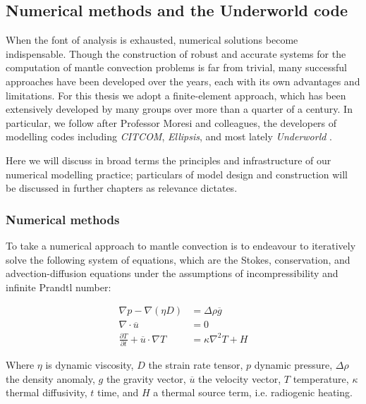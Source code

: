 \documentclass[a4paper,11pt,oneside]{book}
\begin{document}
\subsection{Numerical methods and the Underworld code}

When the font of analysis is exhausted, numerical solutions become indispensable. Though the construction of robust and accurate systems for the computation of mantle convection problems is far from trivial, many successful approaches have been developed over the years, each with its own advantages and limitations. For this thesis we adopt a finite-element approach, which has been extensively developed by many groups over more than a quarter of a century. In particular, we follow after Professor Moresi and colleagues, the developers of modelling codes including \textit{CITCOM}, \textit{Ellipsis}, and most lately \textit{Underworld} \citet{Moresi1995-rn, Moresi1996-fn, Zhong1998-qg, Moresi2002-pj, Moresi2003-ip, Farrington2005-mo, Moresi2007-dg, May2008-pq, Beucher2019-aq}.

Here we will discuss in broad terms the principles and infrastructure of our numerical modelling practice; particulars of model design and construction will be discussed in further chapters as relevance dictates.

\subsubsection{Numerical methods}

To take a numerical approach to mantle convection is to endeavour to iteratively solve the following system of equations, which are the Stokes, conservation, and advection-diffusion equations under the assumptions of incompressibility and infinite Prandtl number:

\begin{align*}
\nabla p - \nabla \left( \eta D \right) &= \Delta \rho \overline{g} \\
\nabla \cdot \overline{u} &= 0 \\
\frac{\partial T}{\partial t} + \overline{u} \cdot \nabla T &= \kappa \nabla^2 T + H
\end{align*}

Where $\eta$ is dynamic viscosity, $D$ the strain rate tensor, $p$ dynamic pressure, $\Delta\rho$ the density anomaly, $g$ the gravity vector, $\overline{u}$ the velocity vector, $T$ temperature, $\kappa$ thermal diffusivity, $t$ time, and $H$ a thermal source term, i.e. radiogenic heating.
\end{document}
